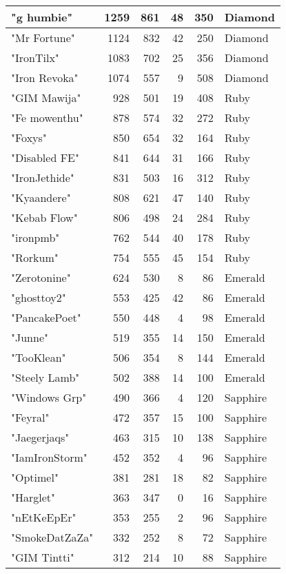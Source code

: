 \documentclass{article}
\begin{document}
\begin{table}[htbp]
\begin{tabular}{|l|r|r|r|r|l|}
"g humbie" & 1259 & 861 & 48 & 350 & Diamond \\ \hline
"Mr Fortune" & 1124 & 832 & 42 & 250 & Diamond \\ \hline
"IronTilx" & 1083 & 702 & 25 & 356 & Diamond \\ \hline
"Iron Revoka" & 1074 & 557 & 9 & 508 & Diamond \\ \hline
"GIM Mawija" & 928 & 501 & 19 & 408 & Ruby \\ \hline
"Fe mowenthu" & 878 & 574 & 32 & 272 & Ruby \\ \hline
"Foxys" & 850 & 654 & 32 & 164 & Ruby \\ \hline
"Disabled FE" & 841 & 644 & 31 & 166 & Ruby \\ \hline
"IronJethide" & 831 & 503 & 16 & 312 & Ruby \\ \hline
"Kyaandere" & 808 & 621 & 47 & 140 & Ruby \\ \hline
"Kebab Flow" & 806 & 498 & 24 & 284 & Ruby \\ \hline
"ironpmb" & 762 & 544 & 40 & 178 & Ruby \\ \hline
"Rorkum" & 754 & 555 & 45 & 154 & Ruby \\ \hline
"Zerotonine" & 624 & 530 & 8 & 86 & Emerald \\ \hline
"ghosttoy2" & 553 & 425 & 42 & 86 & Emerald \\ \hline
"PancakePoet" & 550 & 448 & 4 & 98 & Emerald \\ \hline
"Junne" & 519 & 355 & 14 & 150 & Emerald \\ \hline
"TooKlean" & 506 & 354 & 8 & 144 & Emerald \\ \hline
"Steely Lamb" & 502 & 388 & 14 & 100 & Emerald \\ \hline
"Windows Grp" & 490 & 366 & 4 & 120 & Sapphire \\ \hline
"Feyral" & 472 & 357 & 15 & 100 & Sapphire \\ \hline
"Jaegerjaqs" & 463 & 315 & 10 & 138 & Sapphire \\ \hline
"IamIronStorm" & 452 & 352 & 4 & 96 & Sapphire \\ \hline
"Optimel" & 381 & 281 & 18 & 82 & Sapphire \\ \hline
"Harglet" & 363 & 347 & 0 & 16 & Sapphire \\ \hline
"nEtKeEpEr" & 353 & 255 & 2 & 96 & Sapphire \\ \hline
"SmokeDatZaZa" & 332 & 252 & 8 & 72 & Sapphire \\ \hline
"GIM Tintti" & 312 & 214 & 10 & 88 & Sapphire \\ \hline

\end{tabular}
\end{table}
\end{document}
